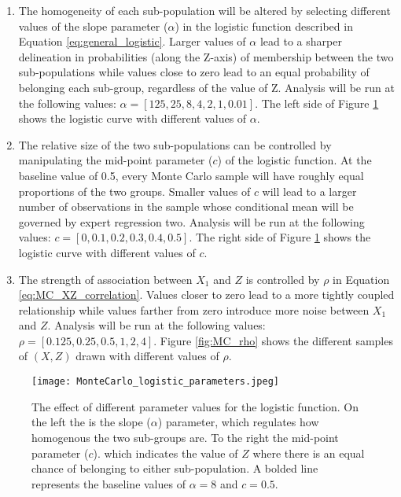 \documentclass[12pt]{article}
\theoremstyle{definition}
\begin{document}
\begin{enumerate}
    \item The homogeneity of each sub-population will be altered by selecting different values of the slope parameter ($\alpha$) in the logistic function described in Equation \ref{eq:general_logistic}. Larger values of $\alpha$ lead to a sharper delineation in probabilities (along the Z-axis) of membership between the two sub-populations while values close to zero lead to an equal probability of belonging each sub-group, regardless of the value of Z. Analysis will be run at the following values: $\alpha = [125, 25, 8, 4, 2, 1, 0.01]$. The left side of Figure \ref{fig:MC_logistic_pars} shows the logistic curve with different values of $\alpha$.
    
    \item The relative size of the two sub-populations can be controlled by manipulating the mid-point parameter ($c$) of the logistic function. At the baseline value of 0.5, every Monte Carlo sample will have roughly equal proportions of the two groups. Smaller values of $c$ will lead to a larger number of observations in the sample whose conditional mean will be governed by expert regression two. Analysis will be run at the following values: $c = [0, 0.1, 0.2, 0.3, 0.4, 0.5]$. The right side of Figure \ref{fig:MC_logistic_pars} shows the logistic curve with different values of $c$.
  
    \item The strength of association between $X_{1}$ and $Z$ is controlled by $\rho$ in Equation \ref{eq:MC_XZ_correlation}. Values closer to zero lead to a more tightly coupled relationship while values farther from zero introduce more noise between $X_{1}$ and $Z$. Analysis will be run at the following values: $\rho = [0.125, 0.25, 0.5, 1, 2, 4]$. Figure \ref{fig:MC_rho} shows the different samples of $(X, Z)$ drawn with different values of $\rho$.
\end{enumerate}


\begin{figure}[!ht]
  \centering
  \texttt{[image: MonteCarlo\_logistic\_parameters.jpeg]}
  \caption{The effect of different parameter values for the logistic function. On the left the is the slope ($\alpha$) parameter, which regulates how homogenous the two sub-groups are. To the right the mid-point parameter ($c$). which indicates the value of $Z$ where there is an equal chance of belonging to either sub-population. A bolded line represents the baseline values of $\alpha = 8$ and $c = 0.5$.}
  \label{fig:MC_logistic_pars}
\end{figure}
\end{document}
